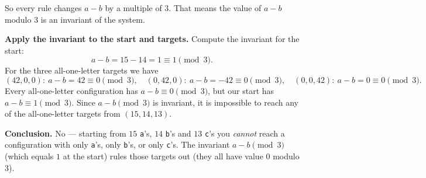 \documentclass{article}
\theoremstyle{plain}
\theoremstyle{definition}
\theoremstyle{remark}
\begin{document}
So every rule changes \(a-b\) by a multiple of \(3\). That means the value of \(a-b\) modulo \(3\) is an invariant of the system.

\bigskip

\textbf{Apply the invariant to the start and targets.}  
Compute the invariant for the start:
\[
a-b = 15-14 = 1 \equiv 1 \pmod{3}.
\]
For the three all-one-letter targets we have
\[
(42,0,0):\ a-b=42\equiv 0\pmod{3},\quad
(0,42,0):\ a-b=-42\equiv 0\pmod{3},\quad
(0,0,42):\ a-b=0\equiv 0\pmod{3}.
\]
Every all-one-letter configuration has \(a-b\equiv 0\pmod{3}\), but our start has \(a-b\equiv 1\pmod{3}\). Since \(a-b\pmod{3}\) is invariant, it is impossible to reach any of the all-one-letter targets from \((15,14,13)\).

\bigskip

\textbf{Conclusion.}  
No — starting from \(15\) \texttt{a}'s, \(14\) \texttt{b}'s and \(13\) \texttt{c}'s you \emph{cannot} reach a configuration with only \texttt{a}'s, only \texttt{b}'s, or only \texttt{c}'s. The invariant \(a-b\pmod{3}\) (which equals \(1\) at the start) rules those targets out (they all have value \(0\) modulo \(3\)).
\end{document}
